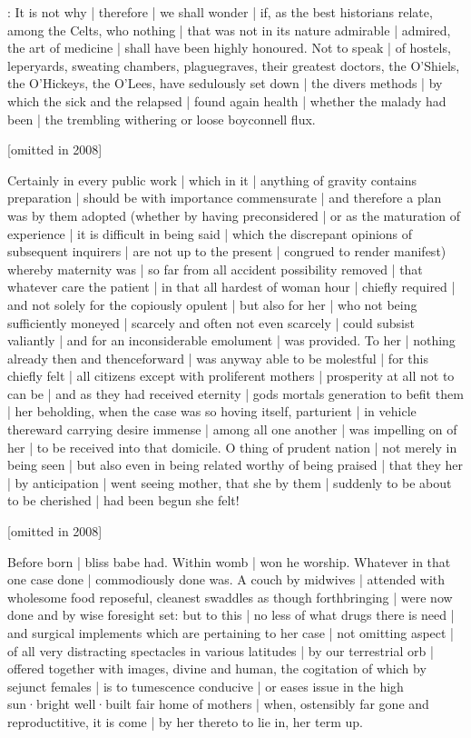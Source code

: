 
:
It is not why |
therefore |
we shall wonder |
if,
as the best historians relate,
among the Celts,
who nothing |
that was not in its nature admirable |
admired,
the art of medicine |
shall have been highly honoured.
Not to speak |
of hostels,
leperyards,
sweating chambers,
plaguegraves,
their greatest doctors,
the O'Shiels,
the O'Hickeys,
the O'Lees,
have sedulously set down |
the divers methods |
by which the sick and the relapsed |
found again health |
whether the malady had been |
the trembling withering or loose boyconnell flux.

[omitted in 2008]

Certainly in every public work |
which in it |
anything of gravity contains preparation |
should be with importance commensurate |
and therefore a plan was by them adopted
(whether by having preconsidered |
or as the maturation of experience |
it is difficult in being said |
which the discrepant opinions of subsequent inquirers |
are not up to the present |
congrued to render manifest)
whereby maternity was |
so far from all accident possibility removed |
that whatever care the patient |
in that all hardest of woman hour |
chiefly required |
and not solely for the copiously opulent |
but also for her |
who not being sufficiently moneyed |
scarcely and often not even scarcely |
could subsist valiantly |
and for an inconsiderable emolument |
was provided.
To her |
nothing already then and thenceforward |
was anyway able to be molestful |
for this chiefly felt |
all citizens except with proliferent mothers |
prosperity at all not to can be |
and as they had received eternity |
gods mortals generation to befit them |
her beholding,
when the case was so hoving itself,
parturient |
in vehicle thereward carrying desire immense |
among all one another |
was impelling on of her |
to be received into that domicile.
O thing of prudent nation |
not merely in being seen |
but also even in being related worthy of being praised |
that they her |
by anticipation |
went seeing mother,
that she by them |
suddenly to be about to be cherished |
had been begun she felt!



[omitted in 2008]

Before born |
bliss babe had.
Within womb |
won he worship.
Whatever in that one case done |
commodiously done was.
A couch by midwives |
attended with wholesome food reposeful,
cleanest swaddles as though forthbringing |
were now done and by wise foresight set:
but to this |
no less of what drugs there is need |
and surgical implements which are pertaining to her case |
not omitting aspect |
of all very distracting spectacles in various latitudes |
by our terrestrial orb |
offered together with images,
divine and human,
the cogitation of which by sejunct females |
is to tumescence conducive |
or eases issue in the high sun·bright well·built fair home of mothers |
when,
ostensibly far gone and reproductitive,
it is come |
by her thereto to lie in,
her term up.

